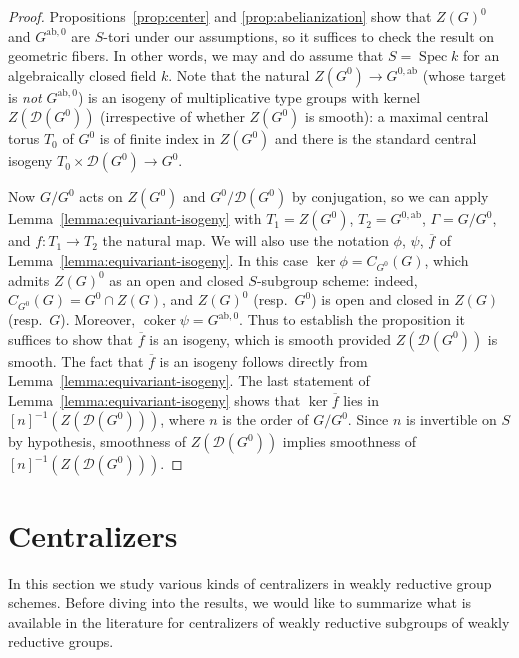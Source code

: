 \documentclass[11pt, letterpaper,english]{amsart}
\theoremstyle{plain}
\theoremstyle{definition}
\numberwithin{equation}{section}
\numberwithin{lem}{section}
\newcommand{\sD}{{\mathscr D}}
\DeclareMathOperator{\coker} {coker}
\DeclareMathOperator{\Spec}{Spec}
\begin{document}
\begin{proof}
Propositions~\ref{prop:center} and \ref{prop:abelianization} show that $Z(G)^0$ and $G^{\mathrm{ab}, 0}$ are $S$-tori under our assumptions, so it suffices to check the result on geometric fibers. In other words, we may and do assume that $S = \Spec k$ for an algebraically closed field $k$. Note that the natural $Z(G^0) \to G^{0, \mathrm{ab}}$ (whose target is \textit{not} $G^{\mathrm{ab}, 0}$) is an isogeny of multiplicative type groups with kernel $Z(\sD(G^0))$ (irrespective of whether $Z(G^0)$ is smooth): a maximal central torus $T_0$ of $G^0$ is of finite index in $Z(G^0)$ and there is the standard central isogeny $T_0 \times \sD(G^0) \to G^0$. 

Now $G/G^0$ acts on $Z(G^0)$ and $G^0/\sD(G^0)$ by conjugation, so we can apply Lemma~\ref{lemma:equivariant-isogeny} with $T_1 = Z(G^0)$, $T_2 = G^{0, \mathrm{ab}}$, $\Gamma = G/G^0$, and $f: T_1 \to T_2$ the natural map. We will also use the notation $\phi$, $\psi$, $\overline{f}$ of Lemma~\ref{lemma:equivariant-isogeny}. In this case $\ker \phi = C_{G^0}(G)$, which admits $Z(G)^0$ as an open and closed $S$-subgroup scheme: indeed, $C_{G^0}(G) = G^0 \cap Z(G)$, and $Z(G)^0$ (resp.\ $G^0$) is open and closed in $Z(G)$ (resp.\ $G$). Moreover, $\coker\psi = G^{\mathrm{ab}, 0}$. Thus to establish the proposition it suffices to show that $\overline{f}$ is an isogeny, which is smooth provided $Z(\sD(G^0))$ is smooth. The fact that $\overline{f}$ is an isogeny follows directly from Lemma~\ref{lemma:equivariant-isogeny}. The last statement of Lemma~\ref{lemma:equivariant-isogeny} shows that $\ker \overline{f}$ lies in $[n]^{-1}(Z(\sD(G^0)))$, where $n$ is the order of $G/G^0$. Since $n$ is invertible on $S$ by hypothesis, smoothness of $Z(\sD(G^0))$ implies smoothness of $[n]^{-1}(Z(\sD(G^0)))$.
\end{proof}


\section{Centralizers} \label{sec:centralizers}

In this section we study various kinds of centralizers in weakly reductive group schemes. Before diving into the results, we would like to summarize what is available in the literature for centralizers of weakly reductive subgroups of weakly reductive groups.
\end{document}
